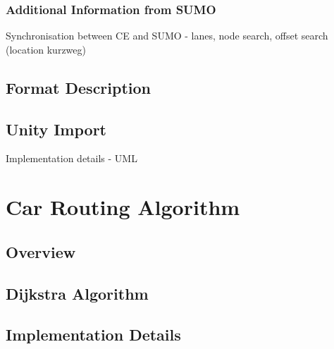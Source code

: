 \subsection{Additional Information from SUMO}
Synchronisation between CE and SUMO - lanes, node search, offset search (location kurzweg)

\section{Format Description}
\label{sec:format}

\section{Unity Import}
Implementation details - UML


\chapter{Car Routing Algorithm}
\label{ch:gps}

\section{Overview}
\section{Dijkstra Algorithm}
\section{Implementation Details}
